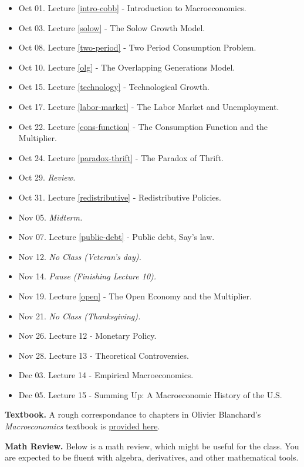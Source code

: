 \documentclass[]{book}
\providecommand{\tightlist}{%
  \setlength{\itemsep}{0pt}\setlength{\parskip}{0pt}}
\theoremstyle{definition}
\theoremstyle{definition}
\theoremstyle{definition}
\theoremstyle{remark}
\begin{document}
\begin{itemize}
\tightlist
\item
  Oct 01. Lecture \ref{intro-cobb} - Introduction to Macroeconomics.
\item
  Oct 03. Lecture \ref{solow} - The Solow Growth Model.
\item
  Oct 08. Lecture \ref{two-period} - Two Period Consumption Problem.
\item
  Oct 10. Lecture \ref{olg} - The Overlapping Generations Model.
\item
  Oct 15. Lecture \ref{technology} - Technological Growth.
\item
  Oct 17. Lecture \ref{labor-market} - The Labor Market and
  Unemployment.
\item
  Oct 22. Lecture \ref{cons-function} - The Consumption Function and the
  Multiplier.
\item
  Oct 24. Lecture \ref{paradox-thrift} - The Paradox of Thrift.
\item
  Oct 29. \emph{Review.}
\item
  Oct 31. Lecture \ref{redistributive} - Redistributive Policies.
\item
  Nov 05. \emph{Midterm.}
\item
  Nov 07. Lecture \ref{public-debt} - Public debt, Say's law.
\item
  Nov 12. \emph{No Class (Veteran's day).}
\item
  Nov 14. \emph{Pause (Finishing Lecture 10).}
\item
  Nov 19. Lecture \ref{open} - The Open Economy and the Multiplier.
\item
  Nov 21. \emph{No Class (Thanksgiving).}
\item
  Nov 26. Lecture 12 - Monetary Policy.
\item
  Nov 28. Lecture 13 - Theoretical Controversies.
\item
  Dec 03. Lecture 14 - Empirical Macroeconomics.
\item
  Dec 05. Lecture 15 - Summing Up: A Macroeconomic History of the U.S.
\end{itemize}

\textbf{Textbook.} A rough correspondance to chapters in Olivier
Blanchard's \emph{Macroeconomics} textbook is
\href{https://docs.google.com/spreadsheets/d/1OQzilQvOLusOsv16pJ3FgFN1YAadELe64jJAV2PEsF0/edit?usp=sharing}{provided
here}.

\textbf{Math Review.} Below is a math review, which might be useful for
the class. You are expected to be fluent with algebra, derivatives, and
other mathematical tools.
\end{document}
